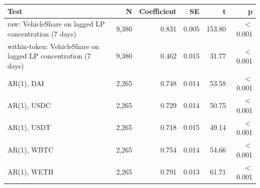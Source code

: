 \begin{tabular}{lrrrrr}
\toprule
Test & N & Coefficient & SE & t & p \\
\midrule
raw: VehicleShare on lagged LP concentration (7 days) & 9,380 & 0.831 & 0.005 & 153.80 & \ensuremath{<}0.001 \\
within-token: VehicleShare on lagged LP concentration (7 days) & 9,380 & 0.462 & 0.015 & 31.77 & \ensuremath{<}0.001 \\
AR(1), DAI & 2,265 & 0.748 & 0.014 & 53.58 & \ensuremath{<}0.001 \\
AR(1), USDC & 2,265 & 0.729 & 0.014 & 50.75 & \ensuremath{<}0.001 \\
AR(1), USDT & 2,265 & 0.718 & 0.015 & 49.14 & \ensuremath{<}0.001 \\
AR(1), WBTC & 2,265 & 0.754 & 0.014 & 54.66 & \ensuremath{<}0.001 \\
AR(1), WETH & 2,265 & 0.791 & 0.013 & 61.71 & \ensuremath{<}0.001 \\
\bottomrule
\end{tabular}
